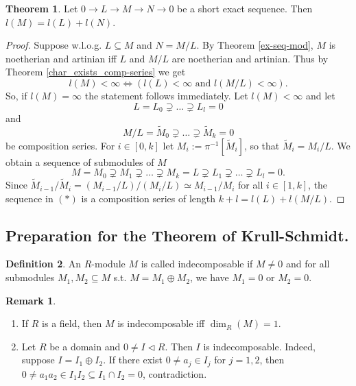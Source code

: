 \documentclass[12pt,a4paper]{report}
\theoremstyle{definition}
\newtheorem{theorem}{Theorem}[chapter] %
\newtheorem{defn}[theorem]{Definition}
\newtheorem*{remark}{Remark}
\theoremstyle{num.custom-title}
\DeclareMathOperator{\sse}{\subseteq}
\newcommand{\IFF}{\Longleftrightarrow}
\begin{document}
\begin{theorem}\label{thm_length_sh-ex-seq}
Let $0 \to L \to M \to N \to 0$ be a short exact sequence. Then $l(M)=l(L)+l(N)$.
\begin{proof}
Suppose w.l.o.g. $L \sse M$ and $N=M/L$. By Theorem \ref{ex-seq-mod}, $M$ is noetherian and artinian iff $L$ and $M/L$ are noetherian and artinian. Thus by Theorem \ref{char_exists_comp-series} we get
\[
l(M) < \infty \IFF ( l(L) < \infty \text{ and } l(M/L) < \infty ).
\]
So, if $l(M)=\infty$ the statement follows immediately. Let $l(M)<\infty$ and let
\[
L=L_0 \supsetneq \ldots \supsetneq L_l =0
\]
and
\[
M/L = \tilde{M}_0 \supsetneq \ldots \supsetneq \tilde{M}_k = 0
\]
be composition series. For $i \in [0,k]$ let $M_i := \pi^{-1}[\tilde{M}_i]$, so that $\tilde{M}_i = M_i/L$. We obtain a sequence of submodules of $M$
\[
M=M_0 \supsetneq M_1 \supsetneq \ldots \supsetneq M_k = L \supsetneq L_1 \supsetneq \ldots \supsetneq L_l=0. \tag{$*$}
\]
Since $\tilde{M}_{i-1}/\tilde{M}_i = (M_{i-1}/L)/(M_i/L) \simeq M_{i-1}/M_i$ for all $i \in [1,k]$, the sequence in $(*)$ is a composition series of length $k+l = l(L)+l(M/L)$.
\end{proof}
\end{theorem}

\subsection{Preparation for the Theorem of Krull-Schmidt.}

\begin{defn}
An $R$-module $M$ is called indecomposable if $M \neq 0$ and for all submodules $M_1,M_2 \sse M$ s.t. $M = M_1 \oplus M_2$, we have $M_1=0$ or $M_2=0$.
\end{defn}

\begin{remark}\ 
\begin{enumerate}
\item If $R$ is a field, then $M$ is indecomposable iff $\dim_R(M)=1$.
\item Let $R$ be a domain and $0 \neq I \lhd R$. Then $I$ is indecomposable. Indeed, suppose $I=I_1 \oplus I_2$. If there exist $0 \neq a_j \in I_j$ for $j=1,2$, then $0 \neq a_1 a_2 \in I_1 I_2 \sse I_1 \cap I_2 = 0$, contradiction.
\end{enumerate}
\end{remark}
\end{document}

